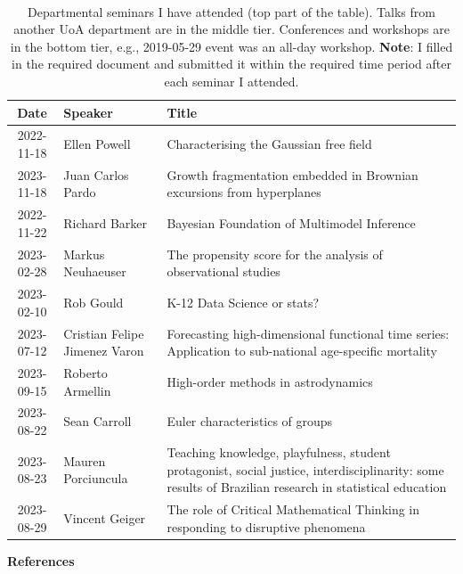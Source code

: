 \documentclass[12pt,a4paper]{article}
\begin{document}
\begin{table}[hh]
\caption{
Departmental seminars I have attended (top part of the table).
Talks from another UoA department are in the middle tier.
Conferences and workshops are in the bottom tier,
e.g., 2019-05-29 event was an all-day workshop.
\textbf{Note}:
I filled in the required document and submitted it
within the required time period after
each seminar I attended.
}
\centering
\ ~~~~ \\
\label{tab:seminars}
\begin{tabular}{|c|l|l|}
\hline
Date & Speaker & Title \\
\hline
2022-11-18 & Ellen Powell &
Characterising the Gaussian free field \\
%
2023-11-18 & Juan Carlos Pardo &
\parbox{10cm}{Growth fragmentation embedded in Brownian excursions from hyperplanes} \\
%

2022-11-22 & Richard Barker &
Bayesian Foundation of Multimodel Inference \\
%
2023-02-28 & Markus Neuhaeuser &
\parbox{10cm}{The propensity score for the analysis of observational studies} \\
%
2023-02-10 & Rob Gould &
K-12 Data Science or stats? \\
%
2023-07-12 & Cristian Felipe Jimenez Varon &
\parbox{10cm}{Forecasting high-dimensional functional time series: Application to sub-national age-specific mortality} \\
%
2023-09-15 & Roberto Armellin &
High-order methods in astrodynamics \\
%
2023-08-22 & Sean Carroll &
Euler characteristics of groups \\
%
2023-08-23 & Mauren Porciuncula &
\parbox{10cm}{Teaching knowledge, playfulness, student protagonist, social justice, interdisciplinarity: some results of Brazilian research in statistical education} \\
%
2023-08-29 & Vincent Geiger &
\parbox{10cm}{The role of Critical Mathematical Thinking in responding to disruptive phenomena} \\
%

\hline
\end{tabular}
\end{table}




\newpage
\textbf{References}
\end{document}
